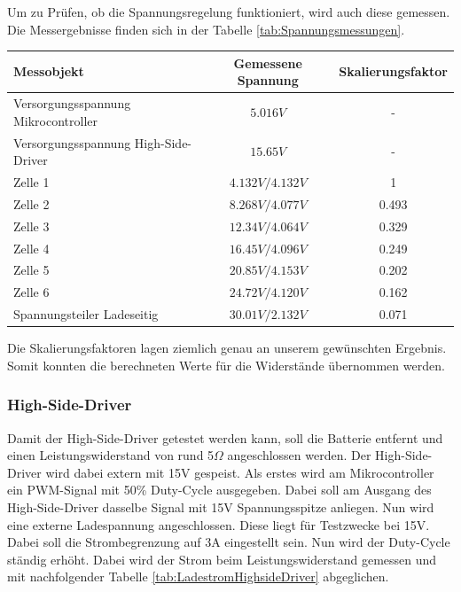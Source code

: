 Um zu Prüfen, ob die Spannungsregelung funktioniert, wird auch diese gemessen. Die Messergebnisse finden sich in der Tabelle \ref{tab:Spannungsmessungen}.

\begin{center}
	\begin{tabular}{l|c|c}
		Messobjekt & Gemessene Spannung & Skalierungsfaktor \\ \hline
		Versorgungsspannung Mikrocontroller & $5.016V$ & - \\ \hline
		Versorgungsspannung High-Side-Driver & $15.65V$ & - \\ \hline
		Zelle 1 & $4.132V / 4.132V$ & 1 \\ \hline
		Zelle 2 & $8.268V / 4.077V$ & 0.493 \\ \hline
		Zelle 3 & $12.34V / 4.064V$ & 0.329 \\ \hline
		Zelle 4 & $16.45V / 4.096V$ & 0.249 \\ \hline
		Zelle 5 & $20.85V / 4.153V$ & 0.202 \\ \hline
		Zelle 6 & $24.72V / 4.120V$ & 0.162 \\ \hline
		Spannungsteiler Ladeseitig & $30.01V / 2.132V$ & 0.071\\ \hline
	\end{tabular} 
	\label{tab:Spannungsmessungen}
\end{center}

Die Skalierungsfaktoren lagen ziemlich genau an unserem gewünschten Ergebnis. Somit konnten die berechneten Werte für die Widerstände übernommen werden.  

\subsubsection*{High-Side-Driver}
\label{Highside-Driver}
Damit der High-Side-Driver getestet werden kann, soll die Batterie entfernt und einen Leistungswiderstand von rund 5$\Omega$ angeschlossen werden. Der High-Side-Driver wird dabei extern mit 15V gespeist. Als erstes wird am Mikrocontroller ein PWM-Signal mit 50\% Duty-Cycle ausgegeben. Dabei soll am Ausgang des High-Side-Driver dasselbe Signal mit 15V Spannungsspitze anliegen. Nun wird eine externe Ladespannung angeschlossen. Diese liegt für Testzwecke bei 15V. Dabei soll die Strombegrenzung auf 3A eingestellt sein. Nun wird der Duty-Cycle ständig erhöht. Dabei wird der Strom beim Leistungswiderstand gemessen und mit nachfolgender Tabelle \ref{tab:LadestromHighsideDriver} abgeglichen.

